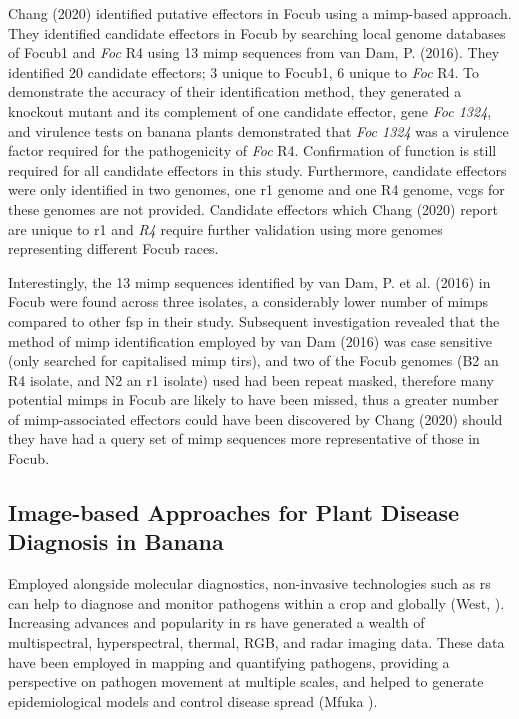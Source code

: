 Chang \et (2020) identified putative effectors in \ac{Focub} using a \ac{mimp}-based approach. They identified candidate effectors in \ac{Focub} by searching local genome databases of \ac{Focub1} and \textit{Foc} R4 using 13 \ac{mimp} sequences from van Dam, P. \et (2016). They identified 20 candidate effectors; 3 unique to \ac{Focub1}, 6 unique to \textit{Foc} R4. To demonstrate the accuracy of their identification method, they generated a knockout mutant and its complement of one candidate effector, gene \textit{Foc 1324}, and virulence tests on banana plants demonstrated that \textit{Foc 1324} was a virulence factor required for the pathogenicity of \textit{Foc} R4. Confirmation of function is still required for all candidate effectors in this study. Furthermore, candidate effectors were only identified in two genomes, one \ac{r1} genome and one R4 genome, \acp{vcg} for these genomes are not provided. Candidate effectors which Chang \et (2020) report are unique to \ac{r1} and \textit{R4} require further validation using more genomes representing different \ac{Focub} races.

Interestingly, the 13 mimp sequences identified by van Dam, P. et al. (2016) in \ac{Focub} were found across three isolates, a considerably lower number of \acp{mimp} compared to other \ac{fsp} in their study. Subsequent investigation revealed that the method of \ac{mimp} identification employed by van Dam \et (2016) was case sensitive (only searched for capitalised \ac{mimp} \acp{tir}), and two of the \ac{Focub} genomes (B2 an R4 isolate, and N2 an \ac{r1} isolate) used had been repeat masked, therefore many potential \acp{mimp} in \ac{Focub} are likely to have been missed, thus a greater number of \ac{mimp}-associated effectors could have been discovered by Chang \et (2020) should they have had a query set of \ac{mimp} sequences more representative of those in \ac{Focub}.

\subsection{Image-based Approaches for Plant Disease Diagnosis in Banana}

Employed alongside molecular diagnostics, non-invasive technologies such as \ac{rs} can help to diagnose and monitor pathogens within a crop and globally (West, ). Increasing advances and popularity in \ac{rs} have generated a wealth of multispectral, hyperspectral, thermal, RGB, and radar imaging data. These data have been employed in mapping and quantifying pathogens, providing a perspective on pathogen movement at multiple scales, and helped to generate epidemiological models and control disease spread (Mfuka ). 

